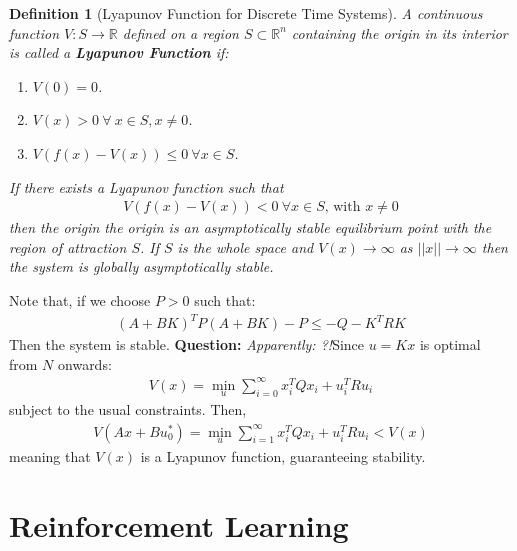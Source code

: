 \documentclass[a4paper]{article}
\newtheorem{definition}[theorem]{Definition}
\newcommand{\question}[1]{{\color{red}\textbf{Question: }\emph{#1}}}
\newcommand{\ix}[1]{%
  \leavevmode %
  \marginpar{\small\emph{#1}}%
}
\begin{document}
\begin{definition}[Lyapunov Function for Discrete Time Systems]
	\ix{Lyapunov Function}A continuous function $V: S \rightarrow \mathbb{R}$ defined on a region $S \subset \mathbb{R}^n$ containing the origin in its interior is called a \textbf{Lyapunov Function} if:
	\begin{enumerate}
		\item $V(0) = 0$.
		\item $V(x) > 0\ \forall\ x\in S, x\neq 0$.
		\item $V(f(x) - V(x)) \leq 0\ \forall x \in S$.  
	\end{enumerate}
	If there exists a Lyapunov function such that \begin{align*}
	V(f(x) - V(x)) < 0\ \forall x \in S\text{, with } x\neq 0
	\end{align*}
	then the origin the origin is an asymptotically stable equilibrium point with the region of attraction $S$. If $S$ is the whole space and $V(x) \rightarrow \infty$ as $||x|| \rightarrow \infty$ then the system is globally asymptotically stable. 
\end{definition}
Note that, if  we choose $P > 0$ such that:
\begin{align}
(A + BK)^T P (A+BK) - P \leq -Q - K^T R K
\end{align}
Then the system is stable. \question{Apparently: ?!}Since $u=Kx$ is optimal from $N$ onwards:
\begin{align}
V(x) = \min_u \sum_{i=0}^\infty x_i^T Q x_i + u_i^T R u_i
\end{align}
subject to the usual constraints. Then, 
\begin{align}
V(Ax + Bu_0^*) = \min_u \sum_{i=1}^\infty x_i^T Q x_i + u_i^T R u_i < V(x)
\end{align}
meaning that $V(x)$ is a Lyapunov function, guaranteeing stability. 

\chapter{Reinforcement Learning}
\end{document}
